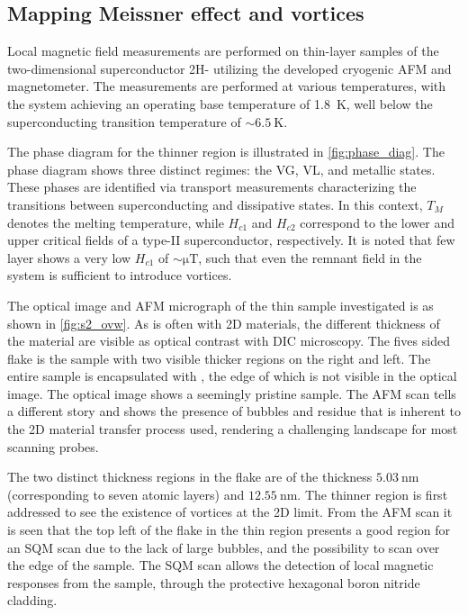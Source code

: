 \subsection{Mapping Meissner effect and vortices}

Local magnetic field measurements are performed on thin-layer samples of the two-dimensional superconductor 2H- utilizing the developed cryogenic \gls{AFM} and magnetometer. The measurements are performed at various temperatures, with the system achieving an operating base temperature of \qty{1.8}{\kelvin}, well below the superconducting transition temperature of $\sim\qty{6.5}{\kelvin}$\cite{zhangNonreciprocalSuperconductingNbSe22020}. 

The phase diagram for the thinner  region is illustrated in \cref{fig:phase_diag}. The phase diagram shows three distinct regimes: the \gls{VG}, \gls{VL}, and metallic states. These phases are identified via transport measurements characterizing the transitions between superconducting and dissipative states\cite{zhangNonreciprocalSuperconductingNbSe22020}. In this context, $T_M$ denotes the melting temperature, while $H_{c1}$ and $H_{c2}$ correspond to the lower and upper critical fields of a type-II superconductor, respectively. It is noted that few layer  shows a very low $H_{c1}$ of $\sim\unit{\micro\tesla}$, such that even the remnant field in the system is sufficient to introduce vortices.

The optical image and \gls{AFM} micrograph of the thin sample investigated is as shown in \cref{fig:s2_ovw}. As is often with 2D materials, the different thickness of the material are visible as optical contrast with \gls{DIC} microscopy. The fives sided flake is the sample with two visible thicker regions on the right and left. The entire sample is encapsulated with , the edge of which is not visible in the optical image. The optical image shows a seemingly pristine sample. The \gls{AFM} scan tells a different story and shows the presence of bubbles and residue that is inherent to the 2D material transfer process used, rendering a challenging landscape for most scanning probes. 

The two distinct  thickness regions in the flake are of the thickness $\qty{5.03}{\nano\meter}$ (corresponding to seven atomic layers) and $\qty{12.55}{\nano\meter}$. The thinner region is first addressed to see the existence of vortices at the 2D limit. From the \gls{AFM} scan it is seen that the top left of the flake in the thin region presents a good region for an \gls{SQM} scan due to the lack of large bubbles, and the possibility to scan over the edge of the sample. The \gls{SQM} scan allows the detection of local magnetic responses from the  sample, through the protective hexagonal boron nitride  cladding.  

